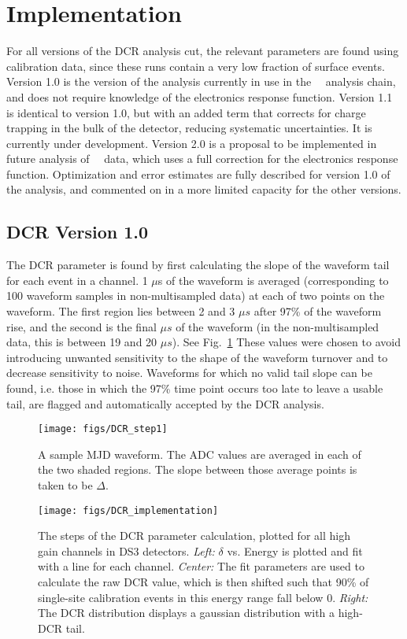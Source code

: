 \documentclass[groupedaddress,rmp,amsmath,amssymb,bibnotes,altaffilletter,twocolumn]{revtex4-1}
\begin{document}
\section{Implementation}
For all versions of the DCR analysis cut, the relevant parameters are found using calibration data, since these runs contain a very low fraction of surface events. Version 1.0 is the version of the analysis currently in use in the \MJ\ \DEM\ analysis chain, and does not require knowledge of the electronics response function. Version 1.1 is identical to version 1.0, but with an added term that corrects for charge trapping in the bulk of the detector, reducing systematic uncertainties. It is currently under development. Version 2.0 is a proposal to be implemented in future analysis of \MJ\ \DEM\ data, which uses a full correction for the electronics response function. Optimization and error estimates are fully described for version 1.0 of the analysis, and commented on in a more limited capacity for the other versions. 

\subsection{DCR Version 1.0}
The DCR parameter is found by first calculating the slope of the waveform tail for each event in a channel. 1 $\mu$s of the waveform is averaged (corresponding to 100 waveform samples in non-multisampled data) at each of two points on the waveform. The first region lies between 2 and 3 $\mu s$ after 97\% of the waveform rise, and the second is the final $\mu s$ of the waveform (in the non-multisampled data, this is between 19 and 20 $\mu s$). See Fig.~\ref{fig:DCR_step1} These values were chosen to avoid introducing unwanted sensitivity to the shape of the waveform turnover and to decrease sensitivity to noise. Waveforms for which no valid tail slope can be found, i.e. those in which the 97\% time point occurs too late to leave a usable tail, are flagged and automatically accepted by the DCR analysis. 

\begin{figure}[h]
 \centering
 \texttt{[image: figs/DCR\_step1]}
 \caption{A sample MJD waveform. The ADC values are averaged in each of the two shaded regions. The slope between those average points is taken to be $\Delta$.} 
 \label{fig:DCR_step1}
\end{figure}

\begin{figure*}[t]
 \centering
 \texttt{[image: figs/DCR\_implementation]}
 \caption{The steps of the DCR parameter calculation, plotted for all high gain channels in DS3 detectors. {\it Left:} $\delta$ vs. Energy is plotted and fit with a line for each channel. {\it Center:} The fit parameters are used to calculate the raw DCR value, which is then shifted such that 90\% of single-site calibration events in this energy range fall below 0. {\it Right:} The DCR distribution displays a gaussian distribution with a high-DCR tail.} 
 \label{fig:DCR_implementation}
\end{figure*}
\end{document}

